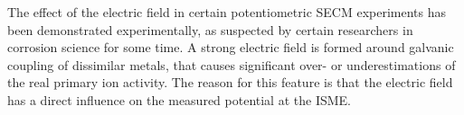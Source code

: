 The effect of the electric field in certain potentiometric SECM experiments has been demonstrated experimentally, as suspected by certain researchers in corrosion science for some time.
A strong electric field is formed around galvanic coupling of dissimilar metals, that causes significant over- or underestimations of the real primary ion activity.
The reason for this feature is that the electric field has a direct influence on the measured potential at the ISME.
